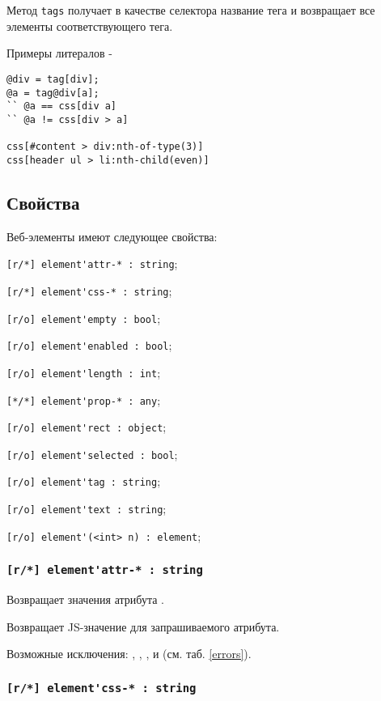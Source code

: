 Метод \lstinline|tags| получает в качестве селектора название тега и возвращает все элементы соответствующего тега.

Примеры литералов -
\begin{lstlisting}[numbers=none]
@div = tag[div];
@a = tag@div[a];
`` @a == css[div a]
`` @a != css[div > a]

css[#content > div:nth-of-type(3)]
css[header ul > li:nth-child(even)]
\end{lstlisting}

\subsection{Свойства}

Веб-элементы имеют следующее свойства:
\begin{icItems}
\item \lstinline|[r/*] element'attr-* : string|;
\item \lstinline|[r/*] element'css-* : string|;
\item \lstinline|[r/o] element'empty : bool|;
\item \lstinline|[r/o] element'enabled : bool|;
\item \lstinline|[r/o] element'length : int|;
\item \lstinline|[*/*] element'prop-* : any|;
\item \lstinline|[r/o] element'rect : object|;
\item \lstinline|[r/o] element'selected : bool|;
\item \lstinline|[r/o] element'tag : string|;
\item \lstinline|[r/o] element'text : string|;
\item \lstinline|[r/o] element'(<int> n) : element|;
\end{icItems} 

\subsubsection{\lstinline|[r/*] element'attr-* : string|}

\code{[w3c]} Возвращает значения атрибута \code{*}.

\code{[icL]} Возвращает JS-значение для запрашиваемого атрибута.

Возможные исключения: , , ,  и  (см. таб. \ref{errors}).

\subsubsection{\lstinline|[r/*] element'css-* : string|}

